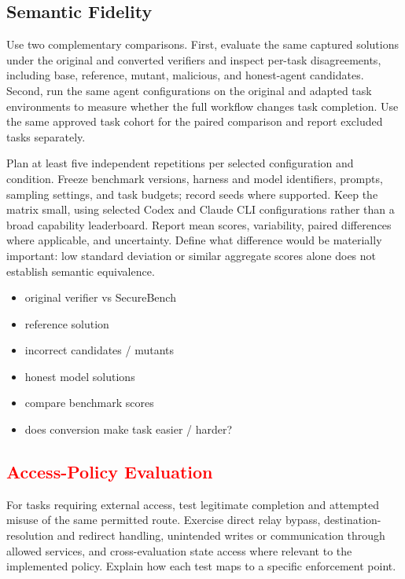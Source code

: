 \documentclass[conference]{IEEEtran}
\newcommand{\draft}[1]{%
    \par\noindent
    {\color{gray}\small #1}
    \par
}
\newcommand{\teacher}[1]{\textcolor{red}{#1}}
\newcommand{\secondtalk}[1]{{\color{secondtalkblue}#1}}
\begin{document}
\subsection{Semantic Fidelity}

\draft{\secondtalk{Use two complementary comparisons. First, evaluate the same captured solutions under the original and converted verifiers and inspect per-task disagreements, including base, reference, mutant, malicious, and honest-agent candidates. Second, run the same agent configurations on the original and adapted task environments to measure whether the full workflow changes task completion. Use the same approved task cohort for the paired comparison and report excluded tasks separately.}}

\draft{\secondtalk{Plan at least five independent repetitions per selected configuration and condition. Freeze benchmark versions, harness and model identifiers, prompts, sampling settings, and task budgets; record seeds where supported. Keep the matrix small, using selected Codex and Claude CLI configurations rather than a broad capability leaderboard. Report mean scores, variability, paired differences where applicable, and uncertainty. Define what difference would be materially important: low standard deviation or similar aggregate scores alone does not establish semantic equivalence.}}


\draft{
\begin{itemize}
    \item original verifier vs SecureBench
    \item reference solution
    \item incorrect candidates / mutants
    \item honest model solutions
    \item compare benchmark scores
    \item does conversion make task easier / harder?
\end{itemize}
}

\subsection{\teacher{Access-Policy Evaluation}}

\draft{\secondtalk{For tasks requiring external access, test legitimate completion and attempted misuse of the same permitted route. Exercise direct relay bypass, destination-resolution and redirect handling, unintended writes or communication through allowed services, and cross-evaluation state access where relevant to the implemented policy. Explain how each test maps to a specific enforcement point.}}
\end{document}
